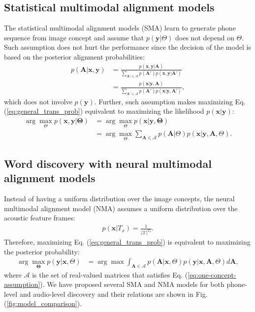 \documentclass[journal]{IEEEtran}
\begin{document}
\subsection{Statistical multimodal alignment models}
 The statistical multimodal alignment models (SMA) learn to generate phone sequence from image concept and assume that $p(\mathbf y|\Theta)$ does not depend on $\Theta$. Such assumption does not hurt the performance since the decision of the model is based on the posterior alignment probabilities:
 \begin{align}\label{eq:argument_for_param_free_y}
     p(\mathbf A|\mathbf x, \mathbf y) &= \frac{p(\mathbf x, \mathbf y|\mathbf A)}{\sum_{\mathbf A' \in \mathcal A} p(\mathbf A')p(\mathbf x, \mathbf y|\mathbf A')}\\
     &= \frac{p(\mathbf x|\mathbf y, \mathbf A)}{\sum_{\mathbf A' \in \mathcal A} p(\mathbf A')p(\mathbf x|\mathbf y, \mathbf A')},
 \end{align}
 which does not involve $p(\mathbf y)$. Further, such assumption makes maximizing Eq. (\ref{eq:general_trans_prob}) equivalent to maximizing the likelihood $p(\mathbf{x}|\mathbf{y})$:
\begin{align}\label{eq:smt_trans_prob}
    \arg \max_{\Theta} p(\mathbf{x},\mathbf{y}|\mathbf \Theta)\nonumber &= \arg \max_{\Theta}
    p(\mathbf{x}|\mathbf y, \mathbf \Theta)\nonumber\\
    &= \arg \max_{\Theta} \sum_{\mathbf{A} \in \mathcal A} p(\mathbf{A}|\Theta) p(\mathbf{x}| \mathbf{y}, \mathbf{A}, \Theta).
\end{align}

\subsection{Word discovery with neural multimodal alignment models}
Instead of having a uniform distribution over the image concepts, the neural multimodal alignment model (NMA) assumes a uniform distribution over the acoustic feature frames:
\begin{align}\label{eq:nmt_acoustic_prior}
    p(\mathbf x|T_x) = \frac{1}{|\mathcal X|^{T_x}}. 
\end{align}
Therefore, maximizing Eq. (\ref{eq:general_trans_prob}) is equivalent to maximizing the posterior probability:
\begin{align}\label{eq:nmt_trans_prob}
    \arg\max_{\mathbf \Theta} p(\mathbf y|\mathbf x, \Theta) &= \arg\max \int_{\mathbf A \in \mathcal A} p(\mathbf A|\mathbf x, \Theta) p(\mathbf y|\mathbf x, \mathbf A, \Theta)d\mathbf A,
\end{align}
where $\mathcal A$ is the set of real-valued matrices that satisfies Eq. (\ref{eq:one-concept-assumption}). We have proposed several SMA and NMA models for both phone-level and audio-level discovery and their relations are shown in Fig. (\ref{fig:model_comparison}).
\end{document}
